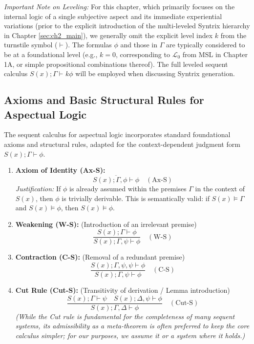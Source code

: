 \documentclass[
    12pt,              %
    a4paper,           %
    headings=normal,   %
    twoside=true,      %
    BCOR=8mm,          %
]{scrbook}
\newcommand{\turnstilek}[1][]{\vdash^{#1}}
\begin{document}
\textit{Important Note on Leveling:} For this chapter, which primarily focuses on the internal logic of a single subjective aspect and its immediate experiential variations (prior to the explicit introduction of the multi-leveled Syntrix hierarchy in Chapter \ref{sec:ch2_main}), we generally omit the explicit level index \(k\) from the turnstile symbol (\(\vdash\)). The formulas \(\phi\) and those in \(\Gamma\) are typically considered to be at a foundational level (e.g., \(k=0\), corresponding to \(\mathcal{L}_0\) from MSL in Chapter 1A, or simple propositional combinations thereof). The full leveled sequent calculus \(S(x); \Gamma \turnstilek{k} \phi\) will be employed when discussing Syntrix generation.

\subsection{Axioms and Basic Structural Rules for Aspectual Logic}
\label{sec:ch1_sequent_axioms_rules} 

The sequent calculus for aspectual logic incorporates standard foundational axioms and structural rules, adapted for the context-dependent judgment form \(S(x); \Gamma \vdash \phi\).

\begin{enumerate}[label=(\alph*)]
    \item  \textbf{Axiom of Identity (Ax-S):}
    \[ \overline{S(x); \Gamma, \phi \vdash \phi} \quad (\text{Ax-S}) \]
    \textit{Justification:} If \(\phi\) is already assumed within the premises \(\Gamma\) in the context of \(S(x)\), then \(\phi\) is trivially derivable. This is semantically valid: if \(S(x) \vDash \Gamma\) and \(S(x) \vDash \phi\), then \(S(x) \vDash \phi\).

    \item  \textbf{Weakening (W-S):} (Introduction of an irrelevant premise)
    \[ \frac{S(x); \Gamma \vdash \phi}{S(x); \Gamma, \psi \vdash \phi} \quad (\text{W-S}) \]

    \item  \textbf{Contraction (C-S):} (Removal of a redundant premise)
    \[ \frac{S(x); \Gamma, \psi, \psi \vdash \phi}{S(x); \Gamma, \psi \vdash \phi} \quad (\text{C-S}) \]

    \item  \textbf{Cut Rule (Cut-S):} (Transitivity of derivation / Lemma introduction)
    \[ \frac{S(x); \Gamma \vdash \psi \quad S(x); \Delta, \psi \vdash \phi}{S(x); \Gamma, \Delta \vdash \phi} \quad (\text{Cut-S}) \]
    \textit{(While the Cut rule is fundamental for the completeness of many sequent systems, its admissibility as a meta-theorem is often preferred to keep the core calculus simpler; for our purposes, we assume it or a system where it holds.)}
\end{enumerate}
\end{document}

